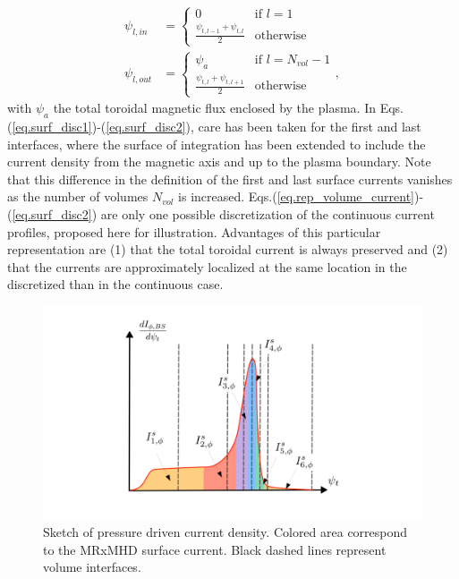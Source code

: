 \documentclass[my_thesis.tex]{subfiles}
\begin{document}
\begin{align}
    \psi_{l,in} &= \begin{cases}
    0 & \text{if } l=1\\
    \frac{\psi_{t,l-1} + \psi_{t,l}}{2} & \text{otherwise}
    \end{cases}\label{eq.surf_disc1} \\
    \psi_{l,out} &= \begin{cases}
    \psi_{a} & \text{if } l=N_{vol}-1\\
    \frac{\psi_{t,l} + \psi_{t,l+1}}{2} & \text{otherwise}
    \end{cases},\label{eq.surf_disc2}
\end{align}
with $\psi_{a}$ the total toroidal magnetic flux enclosed by the plasma. In Eqs.(\ref{eq.surf_disc1})-(\ref{eq.surf_disc2}), care has been taken for the first and last interfaces, where the surface of integration has been extended to include the current density from the magnetic axis and up to the plasma boundary. Note that this difference in the definition of the first and last surface currents vanishes as the number of volumes $N_{vol}$ is increased. Eqs.(\ref{eq.rep_volume_current})-(\ref{eq.surf_disc2}) are only one possible discretization of the continuous current profiles, proposed here for illustration. Advantages of this particular representation are (1) that the total toroidal current is always preserved and (2) that the currents are approximately localized at the same location in the discretized than in the continuous case.


\begin{figure}
    \centering
    \includegraphics[width=\linewidth]{main/Figures_CurrentConstraint/ABaillod_fig4.pdf}
    \caption{Sketch of pressure driven current density. Colored area correspond to the \ac{MRxMHD} surface current. Black dashed lines represent volume interfaces.}
    \label{fig:sketch_bootstrap}
\end{figure}
\end{document}
